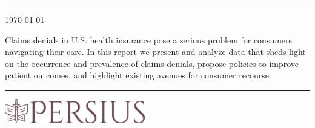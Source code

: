 \documentclass[12pt, a4paper,twoside]{report}
\theoremstyle{plain} %
\theoremstyle{definition} %
\theoremstyle{remark} %
\numberwithin{equation}{chapter}
\begin{document}
		
		
		\thispagestyle{empty} %
		
		\noindent
		\begin{minipage}{0.1\textwidth}
		\end{minipage}
		\hfill
		
		\begin{center}
			\noindent\textcolor{primaryc}{\rule{\linewidth}{4.8pt}}
			
			\vspace{2em}
			
			\vspace{3em}
			
			\vspace{3em}
			{\small \today }

			\vfill
			Claims denials in U.S. health insurance pose a serious problem for consumers navigating their care. In this report we present and analyze data that sheds light on the occurrence and prevalence of claims denials, propose policies to improve patient outcomes, and highlight existing avenues for consumer recourse.
			\vfill
			

			
			\vspace{0.5em}
			\noindent\textcolor{primaryc}{\rule{\linewidth}{4.8pt}}
			

			
			\vspace{3em}
			\includegraphics[width = 10mm]{images/persius/favicon.png}
			\hspace{2mm}
			\includegraphics[width = 50mm]{images/persius/persius_f1_maroon.png}\\[8ex]
		\end{center}
		
		\clearpage
		
		
\end{document}
